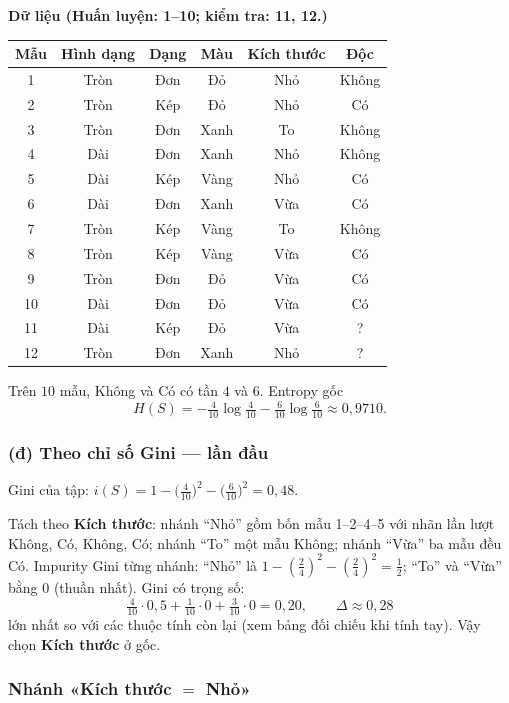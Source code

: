 \textbf{Dữ liệu (Huấn luyện: 1--10; kiểm tra: 11, 12.)}

\begin{center}
{\footnotesize
\begin{tabular}{@{}cccccc@{}}\toprule
Mẫu & Hình dạng & Dạng & Màu & Kích thước & Độc\\\midrule
1 & Tròn & Đơn & Đỏ & Nhỏ & Không\\
2 & Tròn & Kép & Đỏ & Nhỏ & Có\\
3 & Tròn & Đơn & Xanh & To & Không\\
4 & Dài & Đơn & Xanh & Nhỏ & Không\\
5 & Dài & Kép & Vàng & Nhỏ & Có\\
6 & Dài & Đơn & Xanh & Vừa & Có\\
7 & Tròn & Kép & Vàng & To & Không\\
8 & Tròn & Kép & Vàng & Vừa & Có\\
9 & Tròn & Đơn & Đỏ & Vừa & Có\\
10 & Dài & Đơn & Đỏ & Vừa & Có\\
11 & Dài & Kép & Đỏ & Vừa & ?\\
12 & Tròn & Đơn & Xanh & Nhỏ & ?\\
\bottomrule
\end{tabular}
}
\end{center}

Trên \(10\) mẫu, Không và Có có tần \(4\) và \(6\). Entropy gốc
\[
H(S)=-\tfrac{4}{10}\log\tfrac{4}{10}-\tfrac{6}{10}\log\tfrac{6}{10}\approx 0{,}9710.
\]

\subsubsection*{(đ) Theo chỉ số Gini --- lần đầu}

Gini của tập: \(i(S)=1-\bigl(\tfrac{4}{10}\bigr)^2-\bigl(\tfrac{6}{10}\bigr)^2=0{,}48\).

Tách theo \textbf{Kích thước}: nhánh ``Nhỏ'' gồm bốn mẫu 1--2--4--5 với nhãn lần lượt Không, Có, Không, Có; nhánh ``To'' một mẫu Không; nhánh ``Vừa'' ba mẫu đều Có.
Impurity Gini từng nhánh: ``Nhỏ'' là \(1-(\tfrac{2}{4})^2-(\tfrac{2}{4})^2=\tfrac{1}{2}\); ``To'' và ``Vừa'' bằng \(0\) (thuần nhất). Gini có trọng số:
\[
\textstyle \tfrac{4}{10}\cdot 0{,}5+\tfrac{1}{10}\cdot 0+\tfrac{3}{10}\cdot 0=0{,}20,\qquad \Delta\approx 0{,}28
\]
lớn nhất so với các thuộc tính còn lại (xem bảng đối chiếu khi tính tay). Vậy chọn \textbf{Kích thước} ở gốc.

\subsubsection*{Nhánh «Kích thước \(=\) Nhỏ»}

